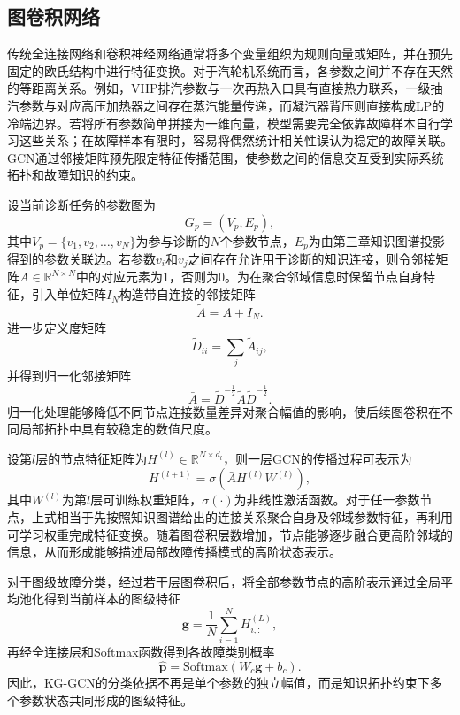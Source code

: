 \subsection{图卷积网络}
\label{subsec:gcn_v2}

传统全连接网络和卷积神经网络通常将多个变量组织为规则向量或矩阵，并在预先固定的欧氏结构中进行特征变换。对于汽轮机系统而言，各参数之间并不存在天然的等距离关系。例如，VHP排汽参数与一次再热入口具有直接热力联系，一级抽汽参数与对应高压加热器之间存在蒸汽能量传递，而凝汽器背压则直接构成LP的冷端边界。若将所有参数简单拼接为一维向量，模型需要完全依靠故障样本自行学习这些关系；在故障样本有限时，容易将偶然统计相关性误认为稳定的故障关联。GCN通过邻接矩阵预先限定特征传播范围，使参数之间的信息交互受到实际系统拓扑和故障知识的约束。

设当前诊断任务的参数图为
\begin{equation}
    G_p=(V_p,E_p),
\end{equation}
其中$V_p=\{v_1,v_2,\ldots,v_N\}$为参与诊断的$N$个参数节点，$E_p$为由第三章知识图谱投影得到的参数关联边。若参数$v_i$和$v_j$之间存在允许用于诊断的知识连接，则令邻接矩阵$A\in\mathbb R^{N\times N}$中的对应元素为1，否则为0。为在聚合邻域信息时保留节点自身特征，引入单位矩阵$I_N$构造带自连接的邻接矩阵
\begin{equation}
    \tilde A=A+I_N.
\end{equation}
进一步定义度矩阵
\begin{equation}
    \tilde D_{ii}=\sum_j\tilde A_{ij},
\end{equation}
并得到归一化邻接矩阵
\begin{equation}
    \bar A=\tilde D^{-\frac{1}{2}}\tilde A\tilde D^{-\frac{1}{2}}.
\end{equation}
归一化处理能够降低不同节点连接数量差异对聚合幅值的影响，使后续图卷积在不同局部拓扑中具有较稳定的数值尺度。

设第$l$层的节点特征矩阵为$H^{(l)}\in\mathbb R^{N\times d_l}$，则一层GCN的传播过程可表示为\cite{Kipf2017GCN}
\begin{equation}
    H^{(l+1)}=\sigma\left(\bar A H^{(l)}W^{(l)}\right),
\end{equation}
其中$W^{(l)}$为第$l$层可训练权重矩阵，$\sigma(\cdot)$为非线性激活函数。对于任一参数节点，上式相当于先按照知识图谱给出的连接关系聚合自身及邻域参数特征，再利用可学习权重完成特征变换。随着图卷积层数增加，节点能够逐步融合更高阶邻域的信息，从而形成能够描述局部故障传播模式的高阶状态表示。

对于图级故障分类，经过若干层图卷积后，将全部参数节点的高阶表示通过全局平均池化得到当前样本的图级特征
\begin{equation}
    \mathbf g=\frac{1}{N}\sum_{i=1}^{N}H^{(L)}_{i,:},
\end{equation}
再经全连接层和Softmax函数得到各故障类别概率
\begin{equation}
    \hat{\mathbf p}=\mathrm{Softmax}(W_c\mathbf g+b_c).
\end{equation}
因此，KG-GCN的分类依据不再是单个参数的独立幅值，而是知识拓扑约束下多个参数状态共同形成的图级特征。

